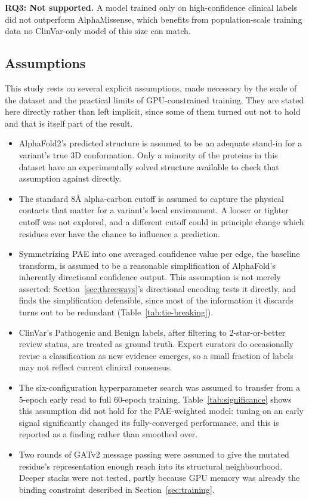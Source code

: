 \documentclass[10pt,conference,a4paper]{IEEEtran}
\begin{document}
\textbf{RQ3: Not supported.} A model trained only on high-confidence clinical labels did not outperform AlphaMissense, which benefits from population-scale training data no ClinVar-only model of this size can match.

\subsection{Assumptions}

This study rests on several explicit assumptions, made necessary by the scale of the dataset and the practical limits of GPU-constrained training. They are stated here directly rather than left implicit, since some of them turned out not to hold and that is itself part of the result.
\begin{itemize}
\item AlphaFold2's predicted structure is assumed to be an adequate stand-in for a variant's true 3D conformation. Only a minority of the proteins in this dataset have an experimentally solved structure available to check that assumption against directly.
\item The standard 8\r{A} alpha-carbon cutoff is assumed to capture the physical contacts that matter for a variant's local environment. A looser or tighter cutoff was not explored, and a different cutoff could in principle change which residues ever have the chance to influence a prediction.
\item Symmetrizing PAE into one averaged confidence value per edge, the baseline transform, is assumed to be a reasonable simplification of AlphaFold's inherently directional confidence output. This assumption is not merely asserted: Section~\ref{sec:threeways}'s directional encoding tests it directly, and finds the simplification defensible, since most of the information it discards turns out to be redundant (Table~\ref{tab:tie-breaking}).
\item ClinVar's Pathogenic and Benign labels, after filtering to 2-star-or-better review status, are treated as ground truth. Expert curators do occasionally revise a classification as new evidence emerges, so a small fraction of labels may not reflect current clinical consensus.
\item The six-configuration hyperparameter search was assumed to transfer from a 5-epoch early read to full 60-epoch training. Table~\ref{tab:significance} shows this assumption did not hold for the PAE-weighted model: tuning on an early signal significantly changed its fully-converged performance, and this is reported as a finding rather than smoothed over.
\item Two rounds of GATv2 message passing were assumed to give the mutated residue's representation enough reach into its structural neighbourhood. Deeper stacks were not tested, partly because GPU memory was already the binding constraint described in Section~\ref{sec:training}.
\end{itemize}
\end{document}
